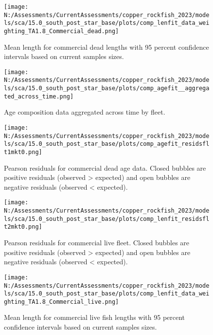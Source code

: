\documentclass[11pt,
  english,
  letterpaper,
]{article}
\begin{document}
\pagebreak

\begin{figure}
\centering
\texttt{[image: N:/Assessments/CurrentAssessments/copper\_rockfish\_2023/models/sca/15.0\_south\_post\_star\_base/plots/comp\_lenfit\_data\_weighting\_TA1.8\_Commercial\_dead.png]}
\caption{Mean length for commercial dead lengths with 95 percent confidence intervals based on current samples sizes.\label{fig:com-dead-mean-len-fit}}
\end{figure}

\pagebreak

\begin{figure}
\centering
\texttt{[image: N:/Assessments/CurrentAssessments/copper\_rockfish\_2023/models/sca/15.0\_south\_post\_star\_base/plots/comp\_agefit\_\_aggregated\_across\_time.png]}
\caption{Age composition data aggregated across time by fleet.\label{fig:agg-marg-age-fit}}
\end{figure}

\pagebreak

\begin{figure}
\centering
\texttt{[image: N:/Assessments/CurrentAssessments/copper\_rockfish\_2023/models/sca/15.0\_south\_post\_star\_base/plots/comp\_agefit\_residsflt1mkt0.png]}
\caption{Pearson residuals for commercial dead age data. Closed bubbles are positive residuals (observed \textgreater{} expected) and open bubbles are negative residuals (observed \textless{} expected).\label{fig:com-dead-age-pearson}}
\end{figure}

\pagebreak

\begin{figure}
\centering
\texttt{[image: N:/Assessments/CurrentAssessments/copper\_rockfish\_2023/models/sca/15.0\_south\_post\_star\_base/plots/comp\_lenfit\_residsflt2mkt0.png]}
\caption{Pearson residuals for commercial live fleet. Closed bubbles are positive residuals (observed \textgreater{} expected) and open bubbles are negative residuals (observed \textless{} expected).\label{fig:com-live-pearson}}
\end{figure}

\pagebreak

\begin{figure}
\centering
\texttt{[image: N:/Assessments/CurrentAssessments/copper\_rockfish\_2023/models/sca/15.0\_south\_post\_star\_base/plots/comp\_lenfit\_data\_weighting\_TA1.8\_Commercial\_live.png]}
\caption{Mean length for commercial live fish lengths with 95 percent confidence intervals based on current samples sizes.\label{fig:com-live-mean-len-fit}}
\end{figure}
\end{document}

